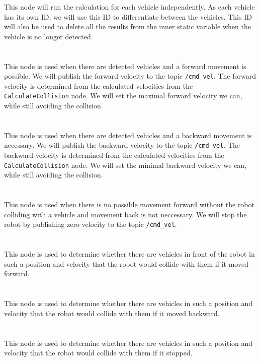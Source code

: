         This node will run the calculation for each vehicle independently. As each vehicle has its own ID, we will use this ID to differentiate between the vehicles. This ID will also be used to delete all the results from the inner static variable when the vehicle is no longer detected.\\\\
    \\
        This node is used when there are detected vehicles and a forward movement is possible. We will publish the forward velocity to the topic \texttt{/cmd\_vel}. The forward velocity is determined from the calculated velocities from the \texttt{CalculateCollision} node. We will set the maximal forward velocity we can, while still avoiding the collision.\\\\
    \\
        This node is used when there are detected vehicles and a backward movement is necessary. We will publish the backward velocity to the topic \texttt{/cmd\_vel}. The backward velocity is determined from the calculated velocities from the \texttt{CalculateCollision} node. We will set the minimal backward velocity we can, while still avoiding the collision.\\\\
    \\
        This node is used when there is no possible movement forward without the robot colliding with a vehicle and movement back is not neccessary. We will stop the robot by publishing zero velocity to the topic \texttt{/cmd\_vel}.\\\\
    \\
        This node is used to determine whether there are vehicles in front of the robot in such a position and velocity that the robot would collide with them if it moved forward.\\\\
    \\
        This node is used to determine whether there are vehicles in such a position and velocity that the robot would collide with them if it moved backward.\\\\
    \\
        This node is used to determine whether there are vehicles in such a position and velocity that the robot would collide with them if it stopped.\\\\
